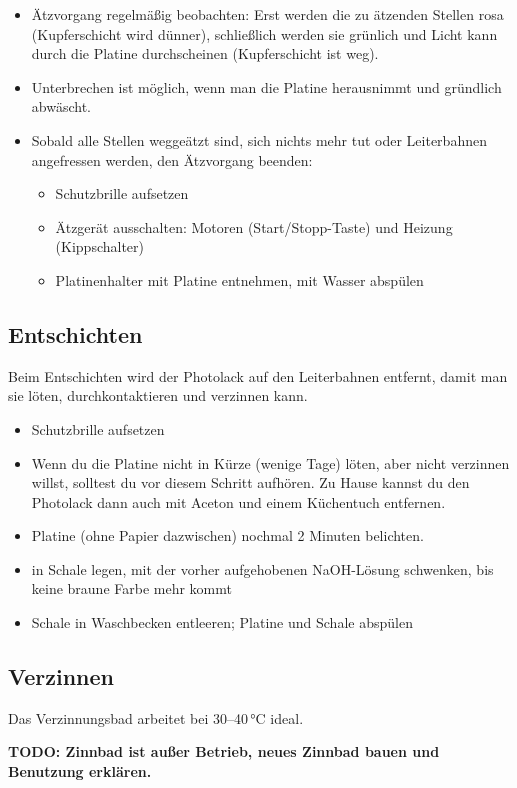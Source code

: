 \documentclass{\basedir/fablab-document}
\begin{document}
\begin{itemize}
\item Ätzvorgang regelmäßig beobachten: Erst werden die zu ätzenden Stellen rosa (Kupferschicht wird dünner), schließlich werden sie grünlich und Licht kann durch die Platine durchscheinen (Kupferschicht ist weg).
\item Unterbrechen ist möglich, wenn man die Platine herausnimmt und gründlich abwäscht.
\item Sobald alle Stellen weggeätzt sind, sich nichts mehr tut oder Leiterbahnen angefressen werden, den Ätzvorgang beenden:
\begin{itemize}
 \item Schutzbrille aufsetzen
 \item Ätzgerät ausschalten: Motoren (Start/Stopp-Taste) und Heizung (Kippschalter)
 \item Platinenhalter mit Platine entnehmen, mit Wasser abspülen
\end{itemize}
\end{itemize}

\subsection{Entschichten}
\label{sec:entschichten}
Beim Entschichten wird der Photolack auf den Leiterbahnen entfernt, damit man sie löten, durchkontaktieren und verzinnen kann.

\begin{itemize}
\item Schutzbrille aufsetzen
\item Wenn du die Platine nicht in Kürze (wenige Tage) löten, aber nicht verzinnen willst, solltest du vor diesem Schritt aufhören. Zu Hause kannst du den Photolack dann auch mit Aceton und einem Küchentuch entfernen.
\item Platine (ohne Papier dazwischen) nochmal 2 Minuten belichten.
\item in Schale legen, mit der vorher aufgehobenen NaOH-Lösung schwenken, bis keine braune Farbe mehr kommt
\item Schale in Waschbecken entleeren; Platine und Schale abspülen
\end{itemize}


\subsection{Verzinnen}
\label{sec:verzinnen}
Das Verzinnungsbad arbeitet bei 30--40\,°C ideal.

\textbf{TODO: Zinnbad ist außer Betrieb, neues Zinnbad bauen und Benutzung erklären.}
\end{document}
